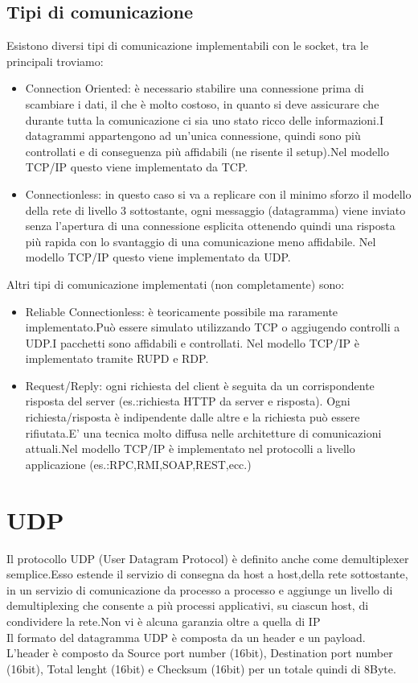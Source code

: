 \subsection{Tipi di comunicazione}
Esistono diversi tipi di comunicazione implementabili con le socket, tra le principali troviamo:
\begin{itemize}
  \item Connection Oriented: è necessario stabilire una connessione prima di scambiare i dati, il che è molto costoso, in quanto si deve assicurare che durante tutta la comunicazione ci sia uno stato ricco delle informazioni.I datagrammi appartengono ad un'unica connessione, quindi sono più controllati e di conseguenza più affidabili (ne risente il setup).Nel modello TCP/IP questo viene implementato da TCP.
  \item Connectionless: in questo caso si va a replicare con il minimo sforzo il modello della rete di livello 3 sottostante, ogni messaggio (datagramma) viene inviato senza l'apertura di una connessione esplicita ottenendo quindi una risposta più rapida con lo svantaggio di una comunicazione meno affidabile. Nel modello TCP/IP questo viene implementato da UDP.
\end{itemize}
Altri tipi di comunicazione implementati (non completamente) sono:
\begin{itemize}
  \item Reliable Connectionless: è teoricamente possibile ma raramente implementato.Può essere simulato utilizzando TCP o aggiugendo controlli a UDP.I pacchetti sono affidabili e controllati. Nel modello TCP/IP è implementato tramite RUPD e RDP.
  \item Request/Reply: ogni richiesta del client è seguita da un corrispondente risposta del server (es.:richiesta HTTP da server e risposta). Ogni richiesta/risposta è indipendente dalle altre e la richiesta può essere rifiutata.E' una tecnica molto diffusa nelle architetture di comunicazioni attuali.Nel modello TCP/IP è implementato nel protocolli a livello applicazione (es.:RPC,RMI,SOAP,REST,ecc.)
\end{itemize}
\section{UDP}
Il protocollo UDP (User Datagram Protocol) è definito anche come demultiplexer semplice.Esso estende il servizio di consegna da host a host,della rete sottostante, in un servizio di comunicazione da processo a processo e aggiunge un livello di demultiplexing che consente a più processi applicativi, su ciascun host, di condividere la rete.Non vi è alcuna garanzia oltre a quella di IP \\
Il formato del datagramma UDP è composta da un header e un payload. L'header è composto da Source port number (16bit), Destination port number (16bit), Total lenght (16bit) e Checksum (16bit) per un totale quindi di 8Byte.
